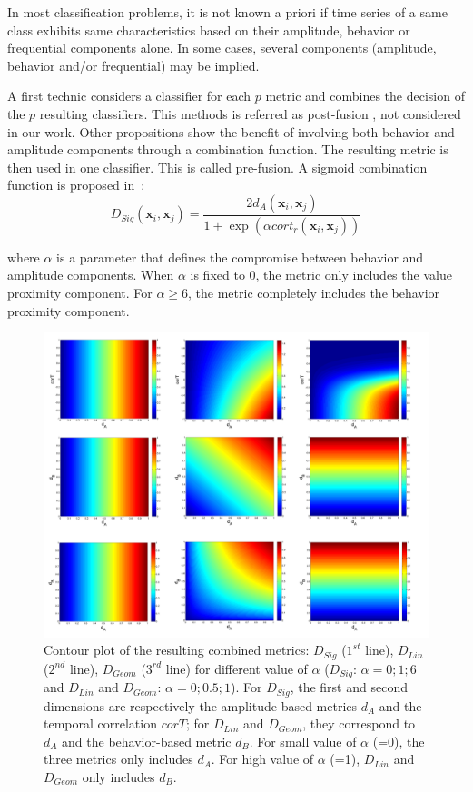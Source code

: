 In most classification problems, it is not known a priori if time series of a same class exhibits same characteristics based on their amplitude,  behavior or frequential components alone. In some cases, several components (amplitude, behavior and/or frequential) may be implied. 

A first technic considers a classifier for each $p$ metric and combines the decision of the $p$ resulting classifiers. This methods is referred as post-fusion , not considered in our work. Other propositions show the benefit of involving both behavior and amplitude components through a combination function. The resulting metric is then used in one classifier. This is called pre-fusion. A sigmoid combination function is proposed in~\cite{AhlameDouzal-Chouakria2011}:
\begin{equation}	
D_{Sig}(\textbf{x}_i,\textbf{x}_j) = \frac{2d_A(\textbf{x}_i,\textbf{x}_j)}{1+\exp(\alpha cort_r(\textbf{x}_i,\textbf{x}_j))}
\label{eq:DSig}
\end{equation}

\noindent where $\alpha$ is a parameter that defines the compromise between behavior and amplitude components. When $\alpha$ is fixed to 0, the metric only includes the value proximity component. For $\alpha \geq 6$, the metric completely includes the behavior proximity component. 

\begin{figure}[h!]
	\centering
	\includegraphics[width=1\linewidth]{images/CombinedMetrics}
	\caption{Contour plot of the resulting combined metrics: $D_{Sig}$ ($1^{st}$ line), $D_{Lin}$ ($2^{nd}$ line), $D_{Geom}$ ($3^{rd}$ line) for different value of $\alpha$ ($D_{Sig}$: $\alpha=0;1;6$ and $D_{Lin}$ and $D_{Geom}$: $\alpha=0;0.5;1$). For $D_{Sig}$, the first and second dimensions are respectively the amplitude-based metrics $d_A$ and the temporal correlation $corT$; for $D_{Lin}$ and $D_{Geom}$, they correspond to $d_A$ and the behavior-based metric $d_B$. For small value of $\alpha$ (=0), the three metrics only includes $d_A$. For high value of $\alpha$ (=1), $D_{Lin}$ and $D_{Geom}$ only includes $d_B$.}
	\label{fig:ContourLine}
\end{figure}


